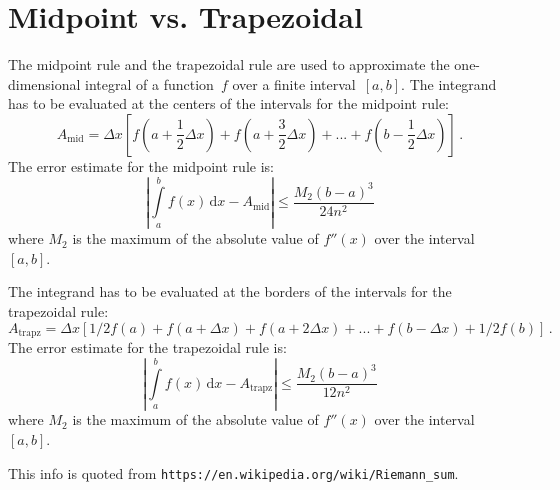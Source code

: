 \FloatBarrier
\newpage
\section{Midpoint vs. Trapezoidal} \label{sec:midpoint_vs_trapz}
The midpoint rule and the trapezoidal rule are used to approximate the one-dimensional integral
of a function~$f$ over a finite interval~$[a,b]$.
The integrand has to be evaluated at the centers of the intervals for the midpoint rule:
\begin{equation}
  A_\mathrm{mid} = \Delta x \left[   f \left(a + \frac{1}{2} \Delta x \right)
                                   + f \left(a + \frac{3}{2} \Delta x \right)
                                   + ...
                                   + f \left(b - \frac{1}{2} \Delta x \right) \right] \, .
\end{equation}
The error estimate for the midpoint rule is:
\begin{equation}
  \left|\int\limits_a^b f(x) \,\mathrm{d}x - A_\mathrm{mid} \right|
  \leq
  \frac{M_2 (b-a)^3}{24 n^2}
\end{equation}
where $M_2$ is the maximum of the absolute value of $f''(x)$ over the interval $[a,b]$.

The integrand has to be evaluated at the borders of the intervals for the trapezoidal rule:
\begin{equation}
  A_\mathrm{trapz} = \Delta x \left[   1/2 f(a)
                                     +     f(a +   \Delta x)
                                     +     f(a + 2 \Delta x)
                                     + ...
                                     +     f(b -   \Delta x)
                                     + 1/2 f(b)\right] \, .
\end{equation}
The error estimate for the trapezoidal rule is:
\begin{equation}
  \left|\int\limits_a^b f(x) \,\mathrm{d}x - A_\mathrm{trapz} \right|
  \leq
  \frac{M_2 (b-a)^3}{12 n^2}
\end{equation}
where $M_2$ is the maximum of the absolute value of $f''(x)$ over the interval $[a,b]$.

This info is quoted from \texttt{https://en.wikipedia.org/wiki/Riemann\_sum}.
